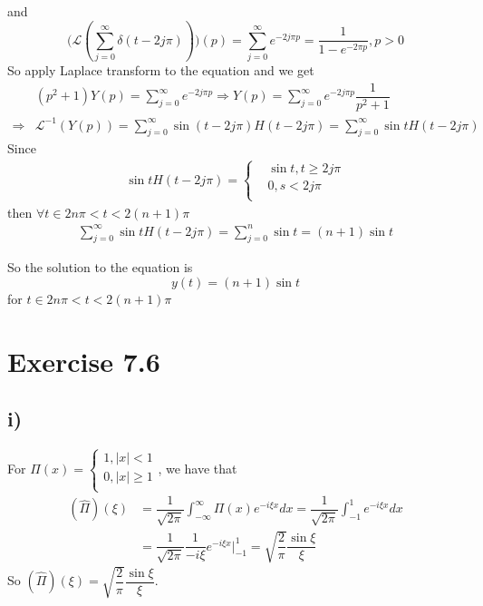 \documentclass[a4paper,12pt,titlepage]{article}
\begin{document}
and
$$\Big(\mathcal{L}(\sum\limits_{j=0}^{\infty}\delta(t-2j\pi))\Big)(p)=\sum\limits_{j=0}^{\infty}e^{-2j\pi p}=\dfrac{1}{1-e^{-2\pi p}},p>0$$
So apply Laplace transform to the equation and we get
\begin{align*}
&(p^2+1)Y(p)=\sum\limits_{j=0}^{\infty}e^{-2j\pi p}\Rightarrow Y(p)=\sum\limits_{j=0}^{\infty}e^{-2j\pi p}\dfrac{1}{p^2+1}\\
\Rightarrow& \mathcal{L}^{-1}(Y(p))=\sum\limits_{j=0}^{\infty}\sin (t-2j\pi)H(t-2j\pi)=\sum\limits_{j=0}^{\infty}\sin tH(t-2j\pi)
\end{align*}
Since
\begin{align*}
\sin tH(t-2j\pi)=\left\{
\begin{aligned}
&\sin t,t\geqslant 2j\pi\\
&0,s<2j\pi\\
\end{aligned}
\right.
\end{align*}
then $\forall t\in 2n\pi<t<2(n+1)\pi$ 
\begin{align*}
\sum\limits_{j=0}^{\infty}\sin tH(t-2j\pi)=\sum\limits_{j=0}^{n}\sin t=(n+1)\sin t
\end{align*}

So the solution to the equation is $$y(t)=(n+1)\sin t$$
for $ t\in 2n\pi<t<2(n+1)\pi$


\section*{Exercise 7.6}
\subsection*{i)}
For $\Pi(x)=\left\{
\begin{aligned}
1,|x|<1\\
0,|x|\geqslant1\\
\end{aligned}
\right.$, we have that
\begin{align*}
(\widehat{\Pi})(\xi)&=\dfrac{1}{\sqrt{2\pi}}\int_{-\infty}^{\infty}\Pi(x)e^{-i\xi x}dx=\dfrac{1}{\sqrt{2\pi}}\int_{-1}^{1}e^{-i\xi x}dx\\
&=\dfrac{1}{\sqrt{2\pi}}\dfrac{1}{-i\xi}e^{-i\xi x}\Big|_{-1}^1=\sqrt{\dfrac{2}{\pi}}\dfrac{\sin\xi}{\xi}
\end{align*}
So $(\widehat{\Pi})(\xi)=\sqrt{\dfrac{2}{\pi}}\dfrac{\sin\xi}{\xi}$.
\end{document}
